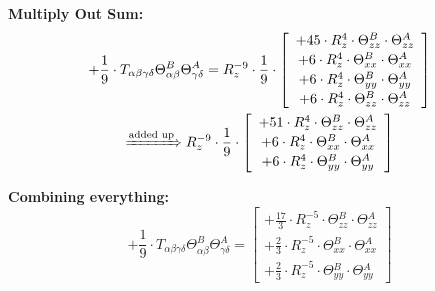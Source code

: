 \documentclass{article}
\begin{document}
\textbf{Multiply Out Sum:}
\begin{subequations}\begin{gather}
+ \frac{1}{9} \cdot T_{\alpha{}\beta{}\gamma{}\delta{}} \Theta{}^{B}_{\alpha{}\beta{}} \Theta{}^{A}_{\gamma{}\delta{}} = R_{z}^{-9} \cdot \frac{1}{9} \cdot  \left[ \begin{array}{c} 
 		+ 45 \cdot R_{z}^{4} \cdot \Theta{}^{B}_{zz} \cdot \Theta{}^{A}_{zz} 
 \\[0.2em] 		 + 6 \cdot R_{z}^{4} \cdot \Theta{}^{B}_{xx} \cdot \Theta{}^{A}_{xx} 
 \\[0.2em] 		 + 6 \cdot R_{z}^{4} \cdot \Theta{}^{B}_{yy} \cdot \Theta{}^{A}_{yy} 
 \\[0.2em] 		 + 6 \cdot R_{z}^{4} \cdot \Theta{}^{B}_{zz} \cdot \Theta{}^{A}_{zz}
 \end{array}\right] 
\\ \xRightarrow{\text{added up}}
 R_{z}^{-9} \cdot \frac{1}{9} \cdot  \left[ \begin{array}{c} 
 		+ 51 \cdot R_{z}^{4} \cdot \Theta{}^{B}_{zz} \cdot \Theta{}^{A}_{zz} 
 \\[0.2em] 		 + 6 \cdot R_{z}^{4} \cdot \Theta{}^{B}_{xx} \cdot \Theta{}^{A}_{xx} 
 \\[0.2em] 		 + 6 \cdot R_{z}^{4} \cdot \Theta{}^{B}_{yy} \cdot \Theta{}^{A}_{yy}
 \end{array}\right] 
\end{gather}\end{subequations}


\textbf{Combining everything:}
\begin{equation}
+ \frac{1}{9} \cdot T_{\alpha{}\beta{}\gamma{}\delta{}} \Theta{}^{B}_{\alpha{}\beta{}} \Theta{}^{A}_{\gamma{}\delta{}} =  \left[ \begin{array}{c} 
 		+ \frac{17}{3} \cdot R_{z}^{-5} \cdot \Theta{}^{B}_{zz} \cdot \Theta{}^{A}_{zz} 
 \\[0.2em] 		 + \frac{2}{3} \cdot R_{z}^{-5} \cdot \Theta{}^{B}_{xx} \cdot \Theta{}^{A}_{xx} 
 \\[0.2em] 		 + \frac{2}{3} \cdot R_{z}^{-5} \cdot \Theta{}^{B}_{yy} \cdot \Theta{}^{A}_{yy}
 \end{array}\right] 
\end{equation}
\end{document}
